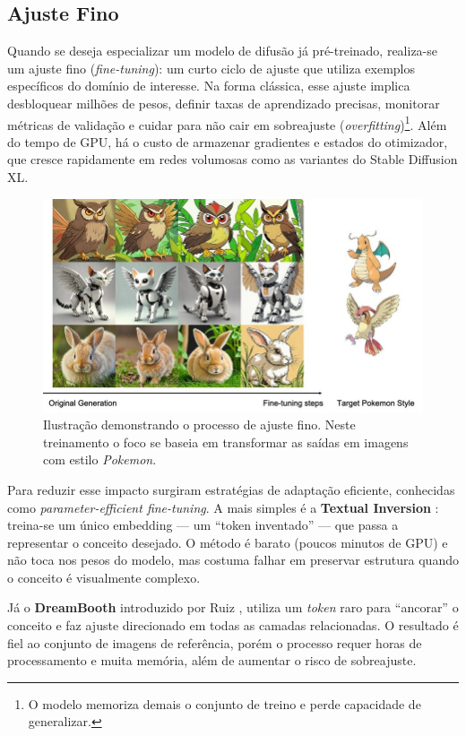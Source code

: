 \documentclass[12pt, %
openright, 
oneside, %
a4paper,    %
brazil]{facom-ufu-abntex2}
\begin{document}
\subsection{Ajuste Fino}

Quando se deseja especializar um modelo de difusão já pré-treinado, realiza-se um ajuste fino (\emph{fine-tuning}): um curto ciclo de ajuste que utiliza exemplos específicos do domínio de interesse. Na forma clássica, esse ajuste implica desbloquear milhões de pesos, definir taxas de aprendizado precisas, monitorar métricas de validação e cuidar para não cair em sobreajuste (\textit{overfitting})\footnote{O modelo memoriza demais o conjunto de treino e perde capacidade de generalizar.}. Além do tempo de GPU, há o custo de armazenar gradientes e estados do otimizador, que cresce rapidamente em redes volumosas como as variantes do Stable Diffusion XL.

\begin{figure}[H]
    \centering
    \includegraphics[width=0.9\linewidth]{finetuning-1.png}
    \caption{Ilustração demonstrando o processo de ajuste fino. Neste treinamento o foco se baseia em transformar as saídas em imagens com estilo \textit{Pokemon}.}
    \label{fig:finetuning1}
\end{figure}

Para reduzir esse impacto surgiram estratégias de adaptação eficiente, conhecidas como \textit{parameter-efficient fine-tuning}. A mais simples é a \textbf{Textual Inversion} \cite{gal2022imageworthwordpersonalizing}: treina-se um único embedding — um ``token inventado'' — que passa a representar o conceito desejado. O método é barato (poucos minutos de GPU) e não toca nos pesos do modelo, mas costuma falhar em preservar estrutura quando o conceito é visualmente complexo.

Já o \textbf{DreamBooth} introduzido por Ruiz \cite{ruiz2023dreamboothfinetuningtexttoimage}, utiliza um \emph{token} raro para ``ancorar'' o conceito e faz ajuste direcionado em todas as camadas relacionadas. O resultado é fiel ao conjunto de imagens de referência, porém o processo requer horas de processamento e muita memória, além de aumentar o risco de sobreajuste.
\end{document}
